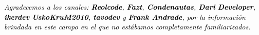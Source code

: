 \documentclass[a4paper]{article}
\begin{document}
{
\textit{\textcolor{black}{Agradecemos a los canales:
}}\textbf{\textit{\textcolor{black}{Reolcode}}}\textit{\textcolor{black}{,
}}\textbf{\textit{\textcolor{black}{Fazt}}}\textit{\textcolor{black}{,
}}\textbf{\textit{\textcolor{black}{Condenautas}}}\textit{\textcolor{black}{,
}}\textbf{\textit{\textcolor{black}{Dari}}}\textit{\textcolor{black}{
}}\textbf{\textit{\textcolor{black}{Developer}}}\textit{\textcolor{black}{,
}}\textbf{\textit{\textcolor{black}{ikerdev}}}\textit{\textcolor{black}{ \newline
}}\textbf{\textit{\textcolor{black}{UskoKruM2010}}}\textit{\textcolor{black}{,
}}\textbf{\textit{\textcolor{black}{tavodev}}}\textit{\textcolor{black}{ y }}\textbf{\textit{\textcolor{black}{Frank
Andrade}}}\textit{\textcolor{black}{, por la información brindada en este campo en el que no estábamos completamente
familiarizados.}}}


\bigskip
\end{document}
